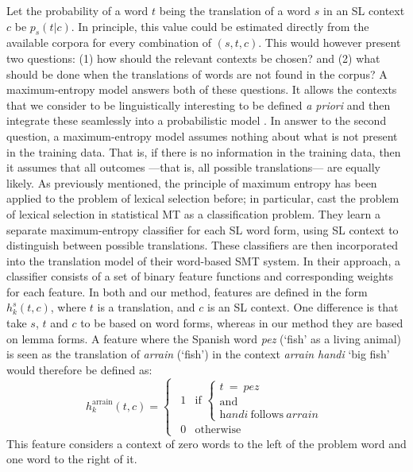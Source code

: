 \documentclass[11pt]{article}
\newcommand{\comment}[1]{\todo{#1}}
\begin{document}
Let the probability of a word $t$ being the translation of a
word $s$ in an SL context $c$ be $p_s(t|c)$. In principle, this value
could be estimated directly from the available corpora for every
combination of $(s, t, c)$.  This would however present two questions:
(1) how should the relevant contexts be chosen? and (2) what should be
done when the translations of words are not found in the corpus?
  A
maximum-entropy model answers both of these questions. It allows the
contexts that we consider to be linguistically interesting to be
defined \emph{a priori} and then integrate these seamlessly into a
probabilistic model \citep{Manning99b}.  In answer to the second
question, a maximum-entropy model assumes nothing about what is not
present in the training data. That is, if there is no information in
the training data, then it assumes that all outcomes ---that is, all
possible translations--- are equally likely.  As previously mentioned,
the principle of maximum entropy has been applied to the problem of
lexical selection before; in particular, \cite{berger1996} cast the
problem of lexical selection in statistical MT as a classification
problem. They learn a separate maximum-entropy classifier for each SL
word form,
using SL context to
distinguish between possible translations. These classifiers are then
incorporated into the translation model of their word-based SMT
system.
In their approach, a
classifier consists of a set of binary feature functions and
corresponding weights for each feature. 
In both \cite{berger1996} and our method, features are defined in the
form $h_k^{s}(t, c)$, where $t$
is a translation, and $c$ is an SL context. One difference is that \cite{berger1996} take $s$, $t$
and $c$ to be based on word forms, whereas in our method they are based
on lemma forms.
A feature where the Spanish word \emph{pez} (`fish' as a living animal) is seen as the
translation of \emph{arrain} (`fish') in the context \emph{arrain
  handi} `big fish' would therefore be defined as:
\begin{equation}
h_k^{\mathrm{arrain}}(t, c) = \left \{ \begin{matrix}
                 ~~1 & \mbox{if } 
\left\{ \begin{array}{c}
t~ =~ \textit{pez}~ \\ \mathrm{and}~ \\ \textit{handi}~ \mathrm{follows}~ \textit{arrain} \end{array} \right. \\
                 ~~0 & \mbox{otherwise} \end{matrix} \right.
\label{eq:feat-func}
\end{equation}
This feature considers a context of zero words to the left of the
problem word and one word to the right of it.
\end{document}
